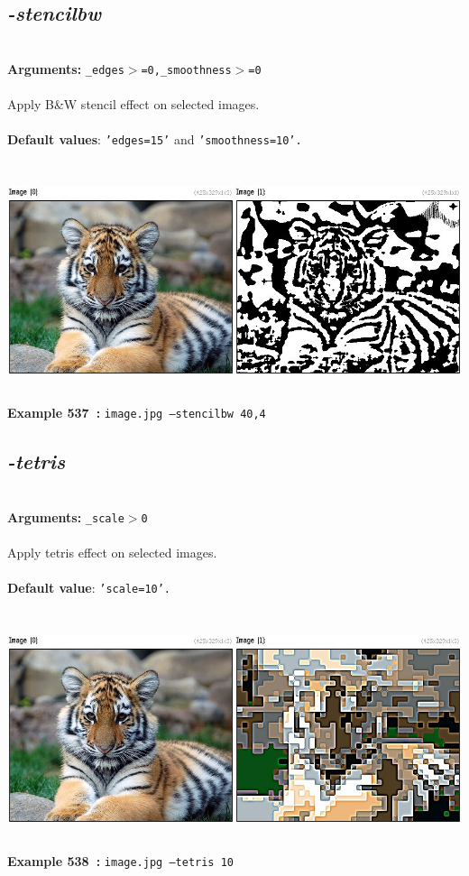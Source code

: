 \documentclass[a4paper,11pt,twoside]{book}
\begin{document}
\subsection{\emph{-stencilbw} }\vspace*{-0.5em}
~\\\textbf{Arguments: } 
{\small \texttt{\_edges$>$=0,\_smoothness$>$=0}}\\~\\
Apply B\&W stencil effect on selected images.
~\\~\\\textbf{Default values}: {\small \texttt{'edges=15'} and \texttt{'smoothness=10'.}}
\begin{center}\includegraphics[keepaspectratio=true,height=7cm,width=\textwidth]{img/gmic_def537.jpg}\\
{\footnotesize \textbf{Example 537~:} \texttt{image.jpg --stencilbw 40,4}}
\end{center}

\subsection{\emph{-tetris} }\vspace*{-0.5em}
~\\\textbf{Arguments: } 
{\small \texttt{\_scale$>$0}}\\~\\
Apply tetris effect on selected images.
~\\~\\\textbf{Default value}: {\small \texttt{'scale=10'.}}
\begin{center}\includegraphics[keepaspectratio=true,height=7cm,width=\textwidth]{img/gmic_def538.jpg}\\
{\footnotesize \textbf{Example 538~:} \texttt{image.jpg --tetris 10}}
\end{center}
\end{document}
